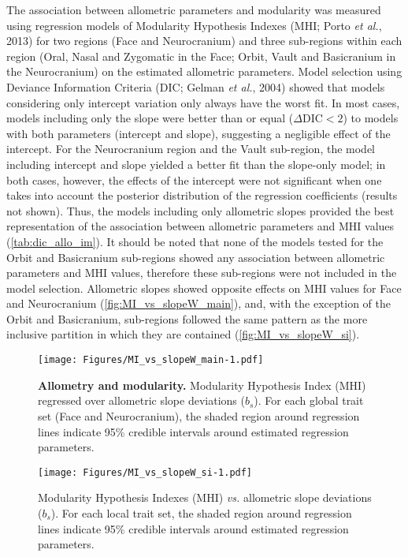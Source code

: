 \documentclass[12pt,twoside]{report}
\begin{document}
The association between allometric parameters and modularity was
measured using regression models of Modularity Hypothesis Indexes (MHI;
Porto \emph{et al.}, 2013) for two regions (Face and Neurocranium) and
three sub-regions within each region (Oral, Nasal and Zygomatic in the
Face; Orbit, Vault and Basicranium in the Neurocranium) on the estimated
allometric parameters. Model selection using Deviance Information
Criteria (DIC; Gelman \emph{et al.}, 2004) showed that models
considering only intercept variation only always have the worst fit. In
most cases, models including only the slope were better than or equal
($\Delta \text{DIC} < 2$) to models with both parameters (intercept and
slope), suggesting a negligible effect of the intercept. For the
Neurocranium region and the Vault sub-region, the model including
intercept and slope yielded a better fit than the slope-only model; in
both cases, however, the effects of the intercept were not significant
when one takes into account the posterior distribution of the regression
coefficients (results not shown). Thus, the models including only
allometric slopes provided the best representation of the association
between allometric parameters and MHI values
(\autoref{tab:dic_allo_im}). It should be noted that none of the models
tested for the Orbit and Basicranium sub-regions showed any association
between allometric parameters and MHI values, therefore these
sub-regions were not included in the model selection. Allometric slopes
showed opposite effects on MHI values for Face and Neurocranium
(\autoref{fig:MI_vs_slopeW_main}), and, with the exception of the Orbit
and Basicranium, sub-regions followed the same pattern as the more
inclusive partition in which they are contained
(\autoref{fig:MI_vs_slopeW_si}).



\begin{figure}[htbp]
\centering
\texttt{[image: Figures/MI\_vs\_slopeW\_main-1.pdf]}
\caption{\textbf{Allometry and modularity.} Modularity Hypothesis Index
(MHI) regressed over allometric slope deviations ($b_s$). For each
global trait set (Face and Neurocranium), the shaded region around
regression lines indicate 95\% credible intervals around estimated
regression parameters. \label{fig:MI_vs_slopeW_main}}
\end{figure}

\begin{figure}[htbp]
\centering
\texttt{[image: Figures/MI\_vs\_slopeW\_si-1.pdf]}
\caption{Modularity Hypothesis Indexes (MHI) \emph{vs.} allometric slope
deviations ($b_s$). For each local trait set, the shaded region around
regression lines indicate 95\% credible intervals around estimated
regression parameters. \label{fig:MI_vs_slopeW_si}}
\end{figure}
\end{document}
